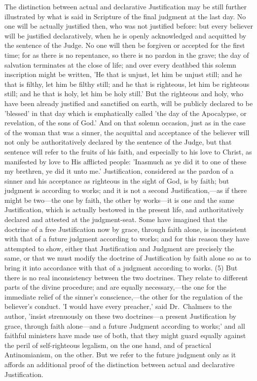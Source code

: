\documentclass[
]{book}
\begin{document}
The distinction between actual and declarative Justification may be still further illustrated by what is said in Scripture of the final judgment at the last day. No one will be actually justified then, who was not justified before: but every believer will be justified declaratively, when he is openly acknowledged and acquitted by the sentence of the Judge. No one will then be forgiven or accepted for the first time; for as there is no repentance, so there is no pardon in the grave; the day of salvation terminates at the close of life; and over every deathbed this solemn inscription might be written, 'He that is unjust, let him be unjust still; and he that is filthy, let him be filthy still; and he that is righteous, let him be righteous still; and he that is holy, let him be holy still.' But the righteous and holy, who have been already justified and sanctified on earth, will be publicly declared to be 'blessed' in that day which is emphatically called 'the day of the Apocalypse, or revelation, of the sons of God.' And on that solemn occasion, just as in the case of the woman that was a sinner, the acquittal and acceptance of the believer will not only be authoritatively declared by the sentence of the Judge, but that sentence will refer to the fruits of his faith, and especially to his love to Christ, as manifested by love to His afflicted people: 'Inasmuch as ye did it to one of these my brethren, ye did it unto me.' Justification, considered as the pardon of a sinner and his acceptance as righteous in the sight of God, is by faith; but judgment is according to works; and it is not a second Justification,---as if there might be two---the one by faith, the other by works---it is one and the same Justification, which is actually bestowed in the present life, and authoritatively declared and attested at the judgment-seat. Some have imagined that the doctrine of a free Justification now by grace, through faith alone, is inconsistent with that of a future judgment according to works; and for this reason they have attempted to show, either that Justification and Judgment are precisely the same, or that we must modify the doctrine of Justification by faith alone so as to bring it into accordance with that of a judgment according to works. (5) But there is no real inconsistency between the two doctrines. They relate to different parts of the divine procedure; and are equally necessary,---the one for the immediate relief of the sinner's conscience,---the other for the regulation of the believer's conduct. 'I would have every preacher,' said Dr.~Chalmers to the author, 'insist strenuously on these two doctrines---a present Justification by grace, through faith alone---and a future Judgment according to works;' and all faithful ministers have made use of both, that they might guard equally against the peril of self-righteous legalism, on the one hand, and of practical Antinomianism, on the other. But we refer to the future judgment only as it affords an additional proof of the distinction between actual and declarative Justification.
\end{document}
